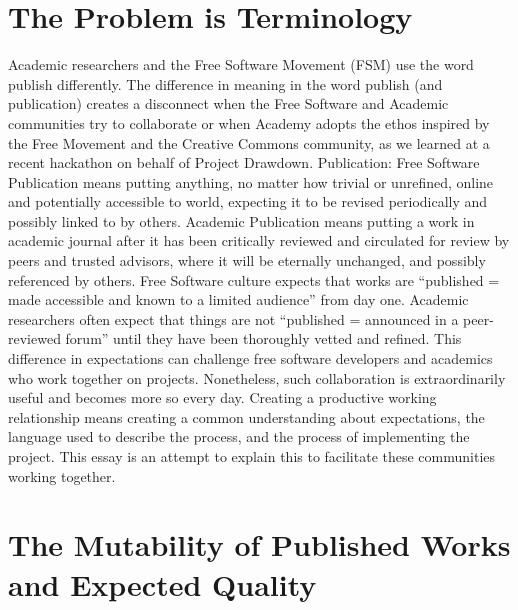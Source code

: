 \documentclass[
	fontsize=10pt, %
	twoside=false, %
	secnumdepth=1, %
]{kaobook}
\begin{document}
\section{The Problem is Terminology}
Academic researchers and the Free Software Movement (FSM) use the word publish differently.
The difference in meaning in the word publish (and publication) creates a disconnect when the Free Software and Academic communities try to collaborate or when Academy adopts the ethos inspired by the Free Movement and the Creative Commons community, as we learned at a recent hackathon on behalf of Project Drawdown.
Publication:
Free Software Publication means putting anything, no matter how trivial or unrefined, online and potentially accessible to world, expecting it to be revised periodically and possibly linked to by others.
Academic Publication means putting a work in academic journal after it has been critically reviewed and circulated for review by peers and trusted advisors, where it will be eternally unchanged, and possibly referenced by others.
Free Software culture expects that works are “published = made accessible and known to a limited audience” from day one. Academic researchers often expect that things are not “published = announced in a peer-reviewed forum” until they have been thoroughly vetted and refined. This difference in expectations can challenge free software developers and academics who work together on projects. Nonetheless, such collaboration is extraordinarily useful and becomes more so every day. Creating a productive working relationship means creating a common understanding about expectations, the language used to describe the process, and the process of implementing the project.
This essay is an attempt to explain this to facilitate these communities working together.

\section{The Mutability of Published Works and Expected Quality}
\end{document}
